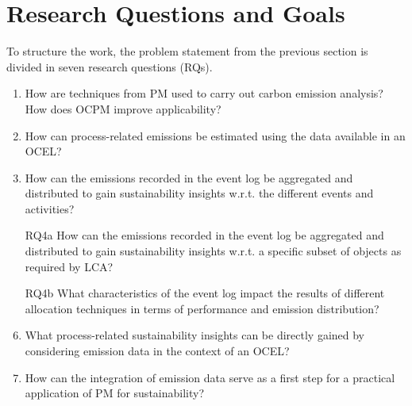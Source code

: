 \section{Research Questions and Goals}
\label{sec:intro-rqs-rgs}

To structure the work, the problem statement from the previous section is divided in seven research questions (RQs).

\begin{enumerate}[label={RQ\arabic*},ref={RQ\arabic*},leftmargin=1.25cm,labelwidth=1cm,align=left]
	\item How are techniques from PM used to carry out carbon emission analysis? How does OCPM improve applicability?
	\label{rq:1-rw}
	\item How can process-related emissions be estimated using the data available in an OCEL?
	\label{rq:2-est}
	\item How can the emissions recorded in the event log be aggregated and distributed to gain sustainability insights w.r.t. the different events and activities?
	\label{rq:3-events}
	\item[RQ4a] How can the emissions recorded in the event log be aggregated and distributed to gain sustainability insights w.r.t. a specific subset of objects as required by LCA?
	\label{rq:4a-obj-lca}
	\item[RQ4b] What characteristics of the event log impact the results of different allocation techniques in terms of performance and emission distribution?
	\label{rq:4b-obj-eva}
	\setcounter{enumi}{4}
	\item What process-related sustainability insights can be directly gained by considering emission data in the context of an OCEL?
	\label{rq:5-insights}
	\item How can the integration of emission data serve as a first step for a practical application of PM for sustainability?
	\label{rq:6-eva}
\end{enumerate}



